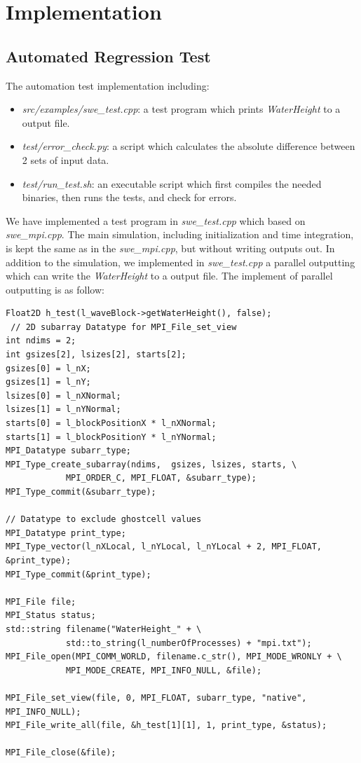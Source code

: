 \documentclass[article]{scrartcl}
\begin{document}
\section{Implementation}
\subsection{Automated Regression Test}
The automation test implementation including:
\begin{itemize}
	\item \textit{src/examples/swe\_test.cpp}: a test program which prints \textit{WaterHeight} to a output file.
	\item \textit{test/error\_check.py}: a script which calculates the absolute difference between 2 sets of input data.
	\item \textit{test/run\_test.sh}: an executable script which first compiles the needed binaries, then runs the tests, and check for errors. 
\end{itemize}
We have implemented a test program in \textit{swe\_test.cpp} which based on \textit{swe\_mpi.cpp}. The main simulation, including initialization and time integration, is kept the same as in the \textit{swe\_mpi.cpp}, but without writing outputs out. In addition to the simulation, we implemented in \textit{swe\_test.cpp} a parallel outputting which can write the \textit{WaterHeight} to a output file. The implement of parallel outputting is as follow:
\begin{frame}[]
\begin{lstlisting}[frame=single]
Float2D h_test(l_waveBlock->getWaterHeight(), false);
 // 2D subarray Datatype for MPI_File_set_view
int ndims = 2;  
int gsizes[2], lsizes[2], starts[2];
gsizes[0] = l_nX;
gsizes[1] = l_nY;
lsizes[0] = l_nXNormal;
lsizes[1] = l_nYNormal;
starts[0] = l_blockPositionX * l_nXNormal;
starts[1] = l_blockPositionY * l_nYNormal;
MPI_Datatype subarr_type;
MPI_Type_create_subarray(ndims,  gsizes, lsizes, starts, \ 
			MPI_ORDER_C, MPI_FLOAT, &subarr_type);
MPI_Type_commit(&subarr_type);

// Datatype to exclude ghostcell values
MPI_Datatype print_type;
MPI_Type_vector(l_nXLocal, l_nYLocal, l_nYLocal + 2, MPI_FLOAT, &print_type);
MPI_Type_commit(&print_type);

MPI_File file;
MPI_Status status;
std::string filename("WaterHeight_" + \
			std::to_string(l_numberOfProcesses) + "mpi.txt");
MPI_File_open(MPI_COMM_WORLD, filename.c_str(), MPI_MODE_WRONLY + \
			MPI_MODE_CREATE, MPI_INFO_NULL, &file);

MPI_File_set_view(file, 0, MPI_FLOAT, subarr_type, "native", MPI_INFO_NULL);
MPI_File_write_all(file, &h_test[1][1], 1, print_type, &status);

MPI_File_close(&file);
\end{lstlisting}
\end{frame}
\end{document}
